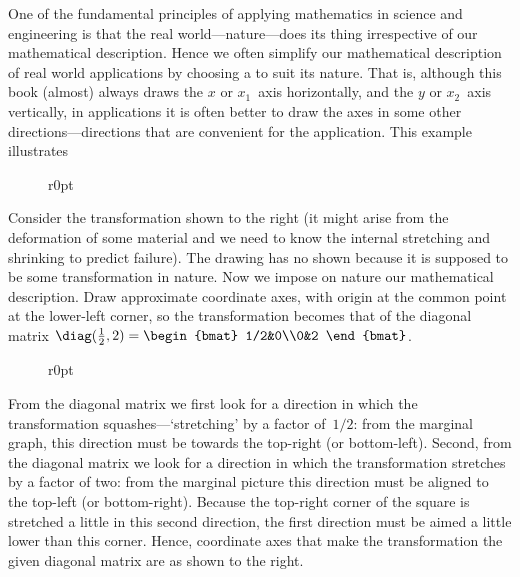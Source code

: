 One of the fundamental principles of applying mathematics in science and engineering
is that the real world---nature---does its thing irrespective of our mathematical description.
Hence we often simplify our mathematical description of real world applications by choosing a  to suit its nature.
That is, although this book (almost) always draws the \(x\) or \(x_1\)~axis horizontally, and the \(y\) or \(x_2\)~axis vertically, in applications it is often better to draw the axes in some other  directions---directions that are convenient for the application.
This example illustrates 


\begin{wrapfigure}r{0pt} 
\end{wrapfigure}
\begin{example} 
Consider the transformation shown to the right (it might arise from the deformation of some material and we need to know the internal stretching and shrinking to predict failure).
The drawing has no  shown because it is supposed to be some transformation in nature. 
Now we impose on nature our mathematical description.
Draw approximate coordinate axes, with origin at the common point at the lower-left corner, so the transformation becomes that of the diagonal matrix \(\diag(\frac12,2)=\begin{bmat} 1/2&0\\0&2 \end{bmat}\).

\begin{solution} 
\begin{wrapfigure}r{0pt}
\end{wrapfigure}
From the diagonal matrix we first look for a direction in which the transformation squashes---`stretching' by a factor of~\(1/2\): from the marginal graph, this direction must be towards the top-right (or bottom-left).
Second, from the diagonal matrix we look for a direction in which the transformation stretches by a factor of two: from the marginal picture this direction must be aligned to the top-left (or bottom-right).
Because the top-right corner of the square is stretched a little in this second direction, the first direction must be aimed a little lower than this corner.
Hence, coordinate axes that make the transformation the given diagonal matrix are as shown to the right. 
\aqed

\end{solution}
\end{example}


